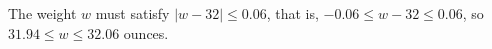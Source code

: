The weight $w$ must satisfy $|w-32|\le0.06$, that is, $-0.06\le w-32\le0.06$, so $\boxed{31.94\le w\le32.06}$ ounces.
